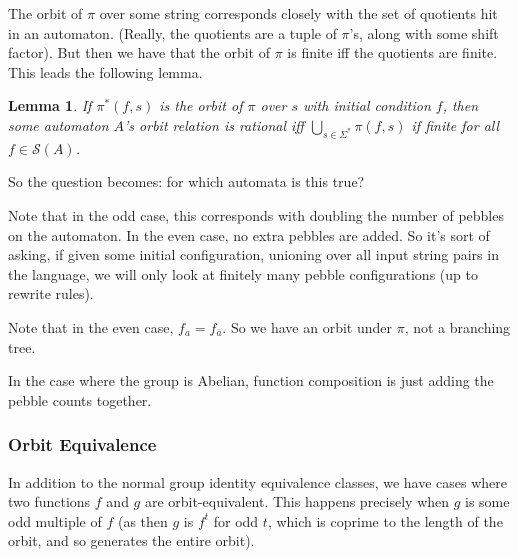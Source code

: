 \documentclass[11pt]{book}
\theoremstyle{pleasant}
\newtheorem{lemma}{Lemma}
\newcommand{\0}{\underline{0}}
\newcommand{\1}{\underline{1}}
\newcommand{\2}{\underline{2}}
\renewcommand{\S}{\mathcal{S}}
\begin{document}
The orbit of $\pi$ over some string corresponds closely with the set of quotients hit in an automaton. (Really, the quotients are a tuple of $\pi$'s, along with some shift factor). But then we have that the orbit of $\pi$ is finite iff the quotients are finite. This leads the following lemma.

\begin{lemma}
If $\pi^*(f, s)$ is the orbit of $\pi$ over $s$ with initial condition $f$, then some automaton $A$'s orbit relation is rational iff $\bigcup_{s\in \Sigma^*} \pi(f, s)$ if finite for all $f \in \S(A)$.
\end{lemma}

So the question becomes: for which automata is this true?

Note that in the odd case, this corresponds with doubling the number of pebbles on the automaton. In the even case, no extra pebbles are added. So it's sort of asking, if given some initial configuration, unioning over all input string pairs in the language, we will only look at finitely many pebble configurations (up to rewrite rules).

Note that in the even case, $f_a = f_{\bar{a}}$. So we have an orbit under $\pi$, not a branching tree.

In the case where the group is Abelian, function composition is just adding the pebble counts together.




\subsubsection*{Orbit Equivalence}

In addition to the normal group identity equivalence classes, we have cases where two functions $f$ and $g$ are orbit-equivalent. This happens precisely when $g$ is some odd multiple of $f$ (as then $g$ is $f^t$ for odd $t$, which is coprime to the length of the orbit, and so generates the entire orbit).
\end{document}
